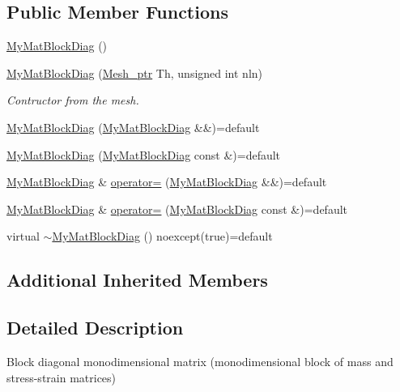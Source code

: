 \subsection*{Public Member Functions}
\begin{DoxyCompactItemize}
\item 
\hyperlink{classTspeed_1_1MyMatBlockDiag_a1edd89c439245f97a1cbfcf81b588211}{My\-Mat\-Block\-Diag} ()
\item 
\hyperlink{classTspeed_1_1MyMatBlockDiag_a0b15666d61963e26ca59203c90ec0161}{My\-Mat\-Block\-Diag} (\hyperlink{namespaceTspeed_a7367a01365c4cc2c1a09305b3effc4e8}{Mesh\-\_\-ptr} Th, unsigned int nln)
\begin{DoxyCompactList}\small\item\em Contructor from the mesh. \end{DoxyCompactList}\item 
\hyperlink{classTspeed_1_1MyMatBlockDiag_ae115b76e406285af1c3d41682ecc359c}{My\-Mat\-Block\-Diag} (\hyperlink{classTspeed_1_1MyMatBlockDiag}{My\-Mat\-Block\-Diag} \&\&)=default
\item 
\hyperlink{classTspeed_1_1MyMatBlockDiag_af6f41226563ccd37cc0113a50af2e0e7}{My\-Mat\-Block\-Diag} (\hyperlink{classTspeed_1_1MyMatBlockDiag}{My\-Mat\-Block\-Diag} const \&)=default
\item 
\hyperlink{classTspeed_1_1MyMatBlockDiag}{My\-Mat\-Block\-Diag} \& \hyperlink{classTspeed_1_1MyMatBlockDiag_a7e7efacca7a0a45f0df066155008ed36}{operator=} (\hyperlink{classTspeed_1_1MyMatBlockDiag}{My\-Mat\-Block\-Diag} \&\&)=default
\item 
\hyperlink{classTspeed_1_1MyMatBlockDiag}{My\-Mat\-Block\-Diag} \& \hyperlink{classTspeed_1_1MyMatBlockDiag_af98e9c0be1adb7bcdfc49f36f2e536d7}{operator=} (\hyperlink{classTspeed_1_1MyMatBlockDiag}{My\-Mat\-Block\-Diag} const \&)=default
\item 
virtual \hyperlink{classTspeed_1_1MyMatBlockDiag_a696ec354baf3873bf85a168a91e5afd7}{$\sim$\-My\-Mat\-Block\-Diag} () noexcept(true)=default
\end{DoxyCompactItemize}
\subsection*{Additional Inherited Members}


\subsection{Detailed Description}
Block diagonal monodimensional matrix (monodimensional block of mass and stress-\/strain matrices) 

